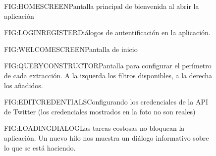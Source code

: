 \begin{figure}[Pantalla inicial]{FIG:HOMESCREEN}{Pantalla principal de bienvenida al abrir la aplicación}
\end{figure}
\begin{figure}[Registro e inicio de sesión]{FIG:LOGINREGISTER}{Diálogos de autentificación en la aplicación.}
	 \quad
\end{figure}
\begin{figure}[Pantalla de bienvenida]{FIG:WELCOMESCREEN}{Pantalla de inicio}
\end{figure}
\begin{figure}[Constructor de consultas]{FIG:QUERYCONSTRUCTOR}{Pantalla para configurar el perímetro de cada extracción. A la izquerda los filtros disponibles, a la derecha los añadidos.}
\end{figure}
\begin{figure}[Edición de credenciales]{FIG:EDITCREDENTIALS}{Configurando los credenciales de la API de Twitter (los credenciales mostrados en la foto no son reales)}
\end{figure}
\begin{figure}[Tarea en segundo plano]{FIG:LOADINGDIALOG}{Las tareas costosas no bloquean la aplicación. Un nuevo hilo nos muestra un diálogo informativo sobre lo que se está haciendo.}
\end{figure}